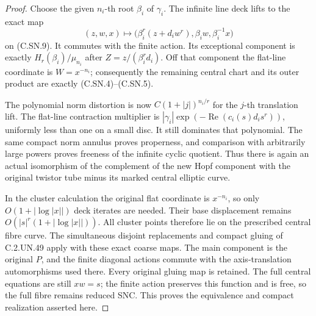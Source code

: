 \begin{proof}
Choose the given $n_i$-th root $\beta_i$
of $\gamma_i$. The infinite line deck
lifts to the exact map
\[
 (z,w,x)\mapsto
   \bigl(\beta_i^r(z+d_iw^r),\beta_iw,\beta_i^{-1}x\bigr)
                                                        \tag{C.SN.10}
\]
on (C.SN.9). It commutes with the finite
action. Its exceptional component is
exactly $H_r(\beta_i)/\mu_{n_i}$ after
$Z=z/(\beta_i^r d_i)$.
Off that component the flat-line
coordinate is $W=x^{-n_i}$; consequently
the remaining central chart and its
outer product are exactly
(C.SN.4)--(C.SN.5).

The polynomial norm distortion is now
$C(1+|j|)^{n_i/r}$ for the $j$-th
translation lift. The flat-line
contraction multiplier is
$|\gamma_i|\exp(-\operatorname{Re}(c_i(s)d_i s^r))$,
uniformly less than one on a small disc.
It still dominates that polynomial.
The same compact norm annulus proves
properness, and comparison with arbitrarily
large powers proves freeness of the
infinite cyclic quotient. Thus there
is again an actual isomorphism of the
complement of the new Hopf component
with the original twistor tube minus
its marked central elliptic curve.

In the cluster calculation the original
flat coordinate is $x^{-n_i}$, so only
$O(1+|\log|x||)$ deck iterates are
needed. Their base displacement remains
$O(|s|^r(1+|\log|x||))$. All cluster
points therefore lie on the prescribed
central fibre curve. The simultaneous
disjoint replacements and compact gluing
of C.2.UN.49 apply with these exact
coarse maps. The main component is the
original $P$, and the finite diagonal
actions commute with the axis-translation
automorphisms used there. Every original
gluing map is retained. The full
central equations are still $xw=s$;
the finite action preserves this
function and is free, so the full
fibre remains reduced SNC.
This proves the equivalence and
compact realization asserted here.
\end{proof}
